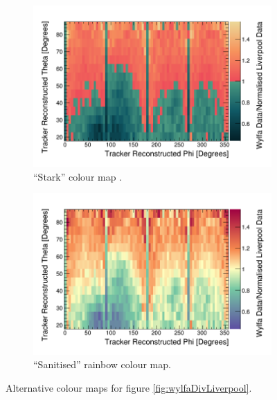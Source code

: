 \begin{figure}[H]
\centering
\begin{subfigure}{.5\textwidth}
  \centering
  \includegraphics[width=\linewidth]{Chapter5/Figs/Raster/WylfaToLiverpoolRatio_starkMap.png}
  \captionsetup{width=.9\linewidth}
  \caption{``Stark'' colour map .}
  \label{subFig:wylfaToLiverpoolRatioStarkMap}
\end{subfigure}%
\begin{subfigure}{.5\textwidth}
  \centering
  \includegraphics[width=\linewidth]{Chapter5/Figs/Raster/WylfaToLiverpoolRatio_sanRbMap.png}
  \captionsetup{width=.9\linewidth}
  \caption{``Sanitised'' rainbow colour map.}
  \label{subFig:wylfaToLiverpoolRatioSanRbMap}
\end{subfigure}
\caption{Alternative colour maps for figure \ref{fig:wylfaDivLiverpool}. }
\label{fig:wylfaToLiverpoolRatioCustomMaps}
\end{figure}

